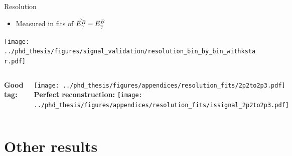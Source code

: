 \documentclass[xcolor=dvipsnames]{beamer}
\begin{document}
\begin{frame}{\EB Resolution}

   \centering\scriptsize

   \begin{itemize}
      \item Measured in fits of $\tilde{{E^B_{\gamma}}}-{E^B_{\gamma}}$
   \end{itemize}

   \texttt{[image: ../phd\_thesis/figures/signal\_validation/resolution\_bin\_by\_bin\_withkstar.pdf]}

\begin{columns}
\centering
\textbf{Good tag:}

\texttt{[image: ../phd\_thesis/figures/appendices/resolution\_fits/2p2to2p3.pdf]}
\centering
\textbf{Perfect reconstruction:}
\texttt{[image: ../phd\_thesis/figures/appendices/resolution\_fits/issignal\_2p2to2p3.pdf]}


\end{columns}

\end{frame}

\section{Other results}
\end{document}
